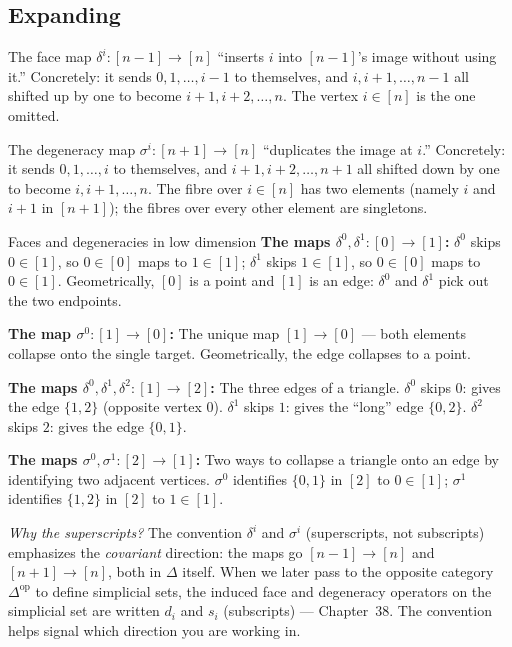 \subsection{Expanding}

The face map $\delta^i : [n-1] \to [n]$ ``inserts $i$ into $[n-1]$'s
image without using it.'' Concretely: it sends $0, 1, \ldots, i-1$ to
themselves, and $i, i+1, \ldots, n-1$ all shifted up by one to become
$i+1, i+2, \ldots, n$. The vertex $i \in [n]$ is the one omitted.

The degeneracy map $\sigma^i : [n+1] \to [n]$ ``duplicates the image
at $i$.'' Concretely: it sends $0, 1, \ldots, i$ to themselves, and
$i+1, i+2, \ldots, n+1$ all shifted down by one to become $i, i+1,
\ldots, n$. The fibre over $i \in [n]$ has two elements (namely $i$ and
$i+1$ in $[n+1]$); the fibres over every other element are singletons.

\begin{example}{Faces and degeneracies in low dimension}
\textbf{The maps $\delta^0, \delta^1 : [0] \to [1]$:}
$\delta^0$ skips $0 \in [1]$, so $0 \in [0]$ maps to $1 \in [1]$;
$\delta^1$ skips $1 \in [1]$, so $0 \in [0]$ maps to $0 \in [1]$.
Geometrically, $[0]$ is a point and $[1]$ is an edge: $\delta^0$ and
$\delta^1$ pick out the two endpoints.

\textbf{The map $\sigma^0 : [1] \to [0]$:}
The unique map $[1] \to [0]$ — both elements collapse onto the single
target. Geometrically, the edge collapses to a point.

\textbf{The maps $\delta^0, \delta^1, \delta^2 : [1] \to [2]$:}
The three edges of a triangle. $\delta^0$ skips $0$: gives the edge
$\{1, 2\}$ (opposite vertex $0$). $\delta^1$ skips $1$: gives the
``long'' edge $\{0, 2\}$. $\delta^2$ skips $2$: gives the edge $\{0, 1\}$.

\textbf{The maps $\sigma^0, \sigma^1 : [2] \to [1]$:}
Two ways to collapse a triangle onto an edge by identifying two adjacent
vertices. $\sigma^0$ identifies $\{0, 1\}$ in $[2]$ to $0 \in [1]$;
$\sigma^1$ identifies $\{1, 2\}$ in $[2]$ to $1 \in [1]$.
\end{example}

\begin{readernote}
\emph{Why the superscripts?} The convention $\delta^i$ and $\sigma^i$
(superscripts, not subscripts) emphasizes the \emph{covariant} direction:
the maps go $[n-1] \to [n]$ and $[n+1] \to [n]$, both in $\Delta$
itself. When we later pass to the opposite category $\Delta^{\mathrm{op}}$
to define simplicial sets, the induced face and degeneracy operators on
the simplicial set are written $d_i$ and $s_i$ (subscripts) — Chapter~38.
The convention helps signal which direction you are working in.
\end{readernote}

